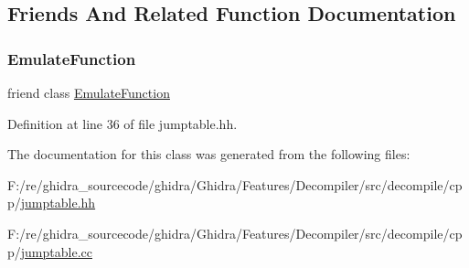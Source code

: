 \subsection{Friends And Related Function Documentation}
\mbox{\label{class_load_table_adea2d7205b5e5454261b8f8e9ff91d81}} 
\subsubsection{\texorpdfstring{EmulateFunction}{EmulateFunction}}
{\footnotesize\ttfamily friend class \mbox{\hyperlink{class_emulate_function}{Emulate\+Function}}\hspace{0.3cm}{\ttfamily [friend]}}



Definition at line 36 of file jumptable.\+hh.



The documentation for this class was generated from the following files\+:\begin{DoxyCompactItemize}
\item 
F\+:/re/ghidra\+\_\+sourcecode/ghidra/\+Ghidra/\+Features/\+Decompiler/src/decompile/cpp/\mbox{\hyperlink{jumptable_8hh}{jumptable.\+hh}}\item 
F\+:/re/ghidra\+\_\+sourcecode/ghidra/\+Ghidra/\+Features/\+Decompiler/src/decompile/cpp/\mbox{\hyperlink{jumptable_8cc}{jumptable.\+cc}}\end{DoxyCompactItemize}
